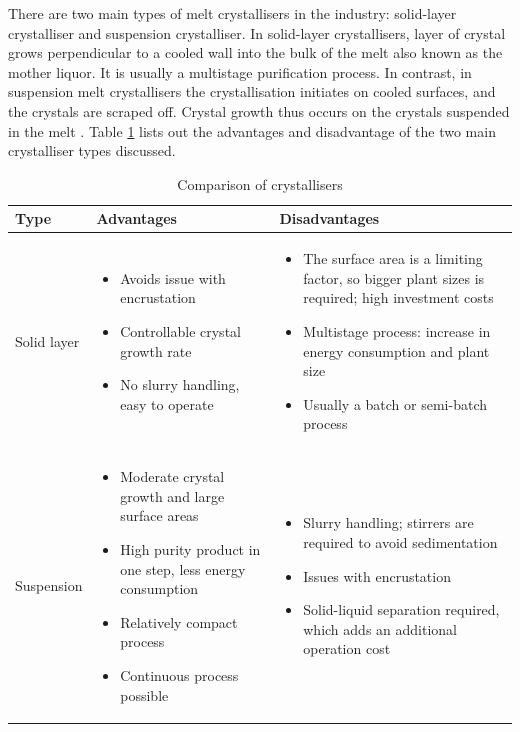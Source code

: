 There are two main types of melt crystallisers in the industry: solid-layer crystalliser and suspension crystalliser. In solid-layer crystallisers, layer of crystal grows perpendicular to a cooled wall into the bulk of the melt also known as the mother liquor. It is usually a multistage purification process. In contrast, in suspension melt crystallisers the crystallisation initiates on cooled surfaces, and the crystals are scraped off. Crystal growth thus occurs on the crystals suspended in the melt \cite{myerson_handbook_2019}. Table \ref{tab:crystallisertype} lists out the advantages and disadvantage of the two main crystalliser types discussed. 

\begin{table}
\caption{Comparison of crystallisers \cite{myerson_handbook_2019} }
\label{tab:crystallisertype}
\begin{tabularx}{\linewidth}{@{}lXX@{}}
\toprule
Type & Advantages                 & Disadvantages                               \\ \midrule
Solid layer & \begin{itemize}[label=+,leftmargin=1em]
  \item Avoids issue with encrustation
  \item Controllable crystal growth rate 
  \item No slurry handling, easy to operate
\end{itemize} & \begin{itemize}[label=-,leftmargin=1em]
  \item The surface area is a limiting factor, so bigger plant sizes is required; high investment costs
  \item Multistage process: increase in energy consumption and plant size 
  \item Usually a batch or semi-batch process
\end{itemize} \\\midrule 
Suspension &  \begin{itemize}[label=+,leftmargin=1em]
  \item Moderate crystal growth and large surface areas 
  \item High purity product in one step, less energy consumption
  \item Relatively compact process
  \item Continuous process possible
\end{itemize} & \begin{itemize}[label=-,leftmargin=1em]
  \item Slurry handling; stirrers are required to avoid sedimentation
  \item Issues with encrustation 
  \item Solid-liquid separation required, which adds an additional operation cost
\end{itemize}
\\\bottomrule
\end{tabularx}
\end{table}

